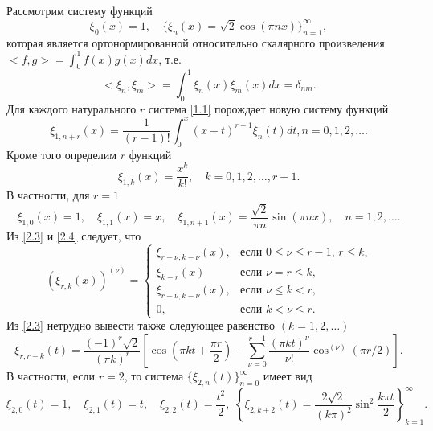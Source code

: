\documentclass{article}
\numberwithin{equation}{section}
\theoremstyle{plain}
\theoremstyle{definition}
\begin{document}
\begin{fulltext}
  Рассмотрим  систему функций
\begin{equation}\label{2.1}
 \xi_0(x)=1,\quad \{\xi_n(x)=\sqrt{2}\cos(\pi nx)\}_{n=1}^\infty,
 \end{equation}
 которая является  ортонормированной относительно скалярного произведения $<f,g>=\int_0^1f(x)g(x)dx$, т.е.
\begin{equation}\label{2.2}
 <\xi_n,\xi_m>=\int_0^1\xi_n(x)\xi_m(x)dx=\delta_{nm}.
 \end{equation}
Для каждого натурального $r$ система \eqref{1.1} порождает новую систему функций
\begin{equation}\label{2.3}
 \xi_{1,n+r}(x)=\frac{1}{(r-1)!}\int_0^x (x-t)^{r-1}\xi_{n}(t)dt,  n=0,1,2,\ldots.
\end{equation}
Кроме того определим $r$ функций
\begin{equation}\label{2.4}
 \xi_{1,k}(x)=\frac{x^k}{k!},\quad  k=0,1,2,\ldots, r-1.
\end{equation}
В частности, для $r=1$
\begin{equation}\label{2.5}
 \xi_{1,0}(x)=1,\quad \xi_{1,1}(x)=x,\quad \xi_{1,n+1}(x)=\frac{\sqrt{2}}{\pi n}\sin(\pi nx),\quad n=1,2,\ldots.
\end{equation}
Из \eqref{2.3} и \eqref{2.4} следует, что
 \begin{equation}\label{2.6}
(\xi_{r,k}(x))^{(\nu)} =\begin{cases}\xi_{r-\nu,k-\nu}(x),&\text{если $0\le\nu\le r-1$, $r\le k$,}\\
\xi_{k-r}(x)&\text{если  $\nu=r\le k$,}\\
\xi_{r-\nu,k-\nu}(x),&\text{если $\nu\le k< r$,}\\
0,&\text{если $k< \nu\le r$}.
  \end{cases}
\end{equation}
Из \eqref{2.3} нетрудно вывести также следующее равенство $(k=1,2,\ldots)$
\begin{equation}\label{2.7}
\xi_{r,r+k}(t) =\frac{(-1)^r\sqrt{2}}{(\pi k)^r}\left[
\cos\left(\pi kt+\frac{\pi r}{2}\right)-\sum_{\nu=0}^{r-1} \frac{(\pi kt)^\nu}{\nu!}\cos^{(\nu)}(\pi r/2)\right].
\end{equation}
В частности, если $r=2$, то система $\{\xi_{2,n}(t)\}_{n=0}^\infty$
имеет вид
 \begin{equation}\label{2.8}
\xi_{2,0}(t) =1, \quad \xi_{2,1}(t)=t, \quad \xi_{2,2}(t)=\frac{t^2}2,\,\,\left\{ \xi_{2,k+2}(t)=  \frac{2\sqrt{2}}{(k\pi)^2}\sin^2\frac{k\pi t}{2}\right\}_{k=1}^\infty.
\end{equation}




\end{fulltext}
\end{document}
